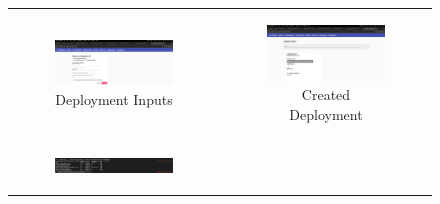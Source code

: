 \begin{enumerate}
\begin{figure}[h!]
    \centering
    \begin{adjustbox}{bgcolor=gray!20, padding=0.7em, margin=1ex}
        \begin{tabular}{cc}
            \begin{subfigure}{0.5\textwidth}
                \centering
                \includegraphics[width=\linewidth]{MWP-Project Report Template - BD-ML-June25/screenshots_classic/7_Deploy_Config.png}
                \caption{Deployment Inputs}
            \end{subfigure} &
            \begin{subfigure}{0.5\textwidth}
                \centering
                \includegraphics[width=\linewidth]{MWP-Project Report Template - BD-ML-June25/screenshots_classic/7a_deployment_created.png}
                \caption{Created Deployment}
            \end{subfigure} \\
            \begin{subfigure}{0.5\textwidth}
                \centering
                \includegraphics[width=\linewidth]{MWP-Project Report Template - BD-ML-June25/screenshots_classic/8_Deployment_Pod_Running.png}

\end{subfigure}
\end{tabular}
\end{adjustbox}
\end{figure}
\end{enumerate}
